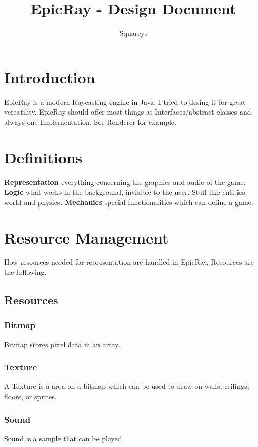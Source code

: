 \documentclass[11pt,a4paper,notitlepage]{article}
\title{EpicRay - Design Document}
\author{Squareys}
\begin{document}
\maketitle

\section{Introduction}
EpicRay is a modern Raycasting engine in Java. I tried to desing it for great versatility. 
EpicRay should offer most things as Interfaces/abstract classes and always one Implementation. See Renderer for example.

\section{Definitions}
\textbf{Representation} everything concerning the graphics and audio of the game.  \newline
\textbf{Logic} what works in the background, invisible to the user. Stuff like entities, world and physics. \newline
\textbf{Mechanics} special functionalities which can define a game.


\section{Resource Management}
How resources needed for representation are handled in EpicRay. Resources are the following.

\subsection{Resources}

\subsubsection{Bitmap}
Bitmap stores pixel data in an array. 

\subsubsection{Texture}
A Texture is a area on a bitmap which can be used to draw on walls, ceilings, floors, or sprites.

\subsubsection{Sound}
Sound is a sample that can be played.
\end{document}
